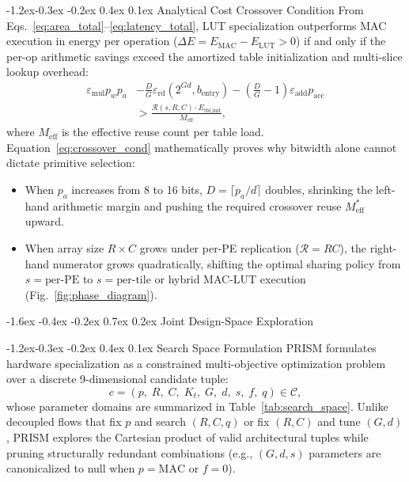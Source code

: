 \documentclass[10pt,letterpaper,twocolumn]{article}
\makeatletter
\renewcommand\section{\@startsection {section}{1}{\z@}%
  {-1.6ex \@plus -0.4ex \@minus -0.2ex}%
  {0.7ex \@plus 0.2ex}%
  {\normalfont\large\bfseries\color{primary}}}
\renewcommand\subsection{\@startsection{subsection}{2}{\z@}%
  {-1.2ex\@plus -0.3ex \@minus -0.2ex}%
  {0.4ex \@plus 0.1ex}%
  {\normalfont\normalsize\bfseries}}
\makeatother
\begin{document}
\subsection{Analytical Cost Crossover Condition}
From Eqs.~\eqref{eq:area_total}--\eqref{eq:latency_total}, LUT specialization outperforms MAC execution in energy per operation ($\Delta E = E_{\text{MAC}} - E_{\text{LUT}} > 0$) if and only if the per-op arithmetic savings exceed the amortized table initialization and multi-slice lookup overhead:
\begin{equation}
  \begin{aligned}
    \varepsilon_{\text{mul}} p_w p_a &- \frac{D}{G} \varepsilon_{\text{rd}}\!\left(2^{Gd}, b_{\text{entry}}\right) - \left(\frac{D}{G} - 1\right)\varepsilon_{\text{add}} p_{\text{acc}} \\
    &> \frac{\mathcal{R}(s, R, C) \cdot E_{\text{tbl\_init}}}{M_{\text{eff}}},
  \end{aligned}
  \label{eq:crossover_cond}
\end{equation}
where $M_{\text{eff}}$ is the effective reuse count per table load. Equation~\eqref{eq:crossover_cond} mathematically proves why bitwidth alone cannot dictate primitive selection:
\begin{itemize}
  \setlength{\itemsep}{1pt}\setlength{\parskip}{0pt}
  \item When $p_a$ increases from 8 to 16 bits, $D = \lceil p_a/d \rceil$ doubles, shrinking the left-hand arithmetic margin and pushing the required crossover reuse $M_{\text{eff}}^*$ upward.
  \item When array size $R \times C$ grows under per-PE replication ($\mathcal{R} = R C$), the right-hand numerator grows quadratically, shifting the optimal sharing policy from $s=\text{per-PE}$ to $s=\text{per-tile}$ or hybrid MAC-LUT execution (Fig.~\ref{fig:phase_diagram}).
\end{itemize}

\section{Joint Design-Space Exploration}
\label{sec:dse}

\subsection{Search Space Formulation}
PRISM formulates hardware specialization as a constrained multi-objective optimization problem over a discrete 9-dimensional candidate tuple:
\begin{equation}
  c = \left( p,\; R,\; C,\; K_t,\; G,\; d,\; s,\; f,\; q \right) \in \mathcal{C},
  \label{eq:candidate_tuple}
\end{equation}
whose parameter domains are summarized in Table~\ref{tab:search_space}. Unlike decoupled flows that fix $p$ and search $(R, C, q)$ or fix $(R, C)$ and tune $(G, d)$, PRISM explores the Cartesian product of valid architectural tuples while pruning structurally redundant combinations (e.g., $(G, d, s)$ parameters are canonicalized to null when $p = \text{MAC}$ or $f = 0$).
\end{document}
